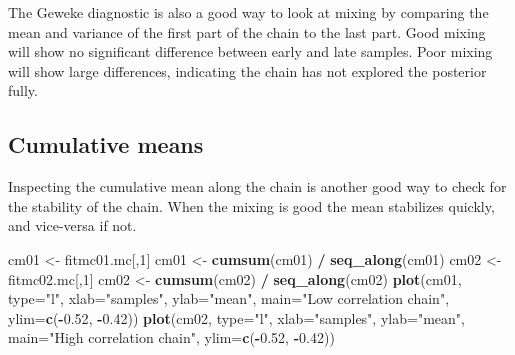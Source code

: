 \documentclass[
]{book}
\newenvironment{Shaded}{\begin{snugshade}}{\end{snugshade}}
\newcommand{\AttributeTok}[1]{\textcolor[rgb]{0.13,0.29,0.53}{#1}}
\newcommand{\DecValTok}[1]{\textcolor[rgb]{0.00,0.00,0.81}{#1}}
\newcommand{\FloatTok}[1]{\textcolor[rgb]{0.00,0.00,0.81}{#1}}
\newcommand{\FunctionTok}[1]{\textcolor[rgb]{0.13,0.29,0.53}{\textbf{#1}}}
\newcommand{\NormalTok}[1]{#1}
\newcommand{\OtherTok}[1]{\textcolor[rgb]{0.56,0.35,0.01}{#1}}
\newcommand{\SpecialCharTok}[1]{\textcolor[rgb]{0.81,0.36,0.00}{\textbf{#1}}}
\newcommand{\StringTok}[1]{\textcolor[rgb]{0.31,0.60,0.02}{#1}}
\begin{document}
The Geweke diagnostic is also a good way to look at mixing by comparing the mean and variance of the first part of the chain to the last part. Good mixing will show no significant difference between early and late samples. Poor mixing will show large differences, indicating the chain has not explored the posterior fully.

\hypertarget{cumulative-means}{%
\subsection{Cumulative means}\label{cumulative-means}}

Inspecting the cumulative mean along the chain is another good way to check for the stability of the chain. When the mixing is good the mean stabilizes quickly, and vice-versa if not.

\begin{Shaded}
\begin{Highlighting}[]
\NormalTok{cm01 }\OtherTok{\textless{}{-}}\NormalTok{ fitmc01.mc[,}\DecValTok{1}\NormalTok{]}
\NormalTok{cm01 }\OtherTok{\textless{}{-}} \FunctionTok{cumsum}\NormalTok{(cm01) }\SpecialCharTok{/} \FunctionTok{seq\_along}\NormalTok{(cm01)}
\NormalTok{cm02 }\OtherTok{\textless{}{-}}\NormalTok{ fitmc02.mc[,}\DecValTok{1}\NormalTok{]}
\NormalTok{cm02 }\OtherTok{\textless{}{-}} \FunctionTok{cumsum}\NormalTok{(cm02) }\SpecialCharTok{/} \FunctionTok{seq\_along}\NormalTok{(cm02)}
\FunctionTok{plot}\NormalTok{(cm01, }\AttributeTok{type=}\StringTok{"l"}\NormalTok{, }\AttributeTok{xlab=}\StringTok{"samples"}\NormalTok{, }\AttributeTok{ylab=}\StringTok{"mean"}\NormalTok{, }\AttributeTok{main=}\StringTok{"Low correlation chain"}\NormalTok{, }\AttributeTok{ylim=}\FunctionTok{c}\NormalTok{(}\SpecialCharTok{{-}}\FloatTok{0.52}\NormalTok{, }\SpecialCharTok{{-}}\FloatTok{0.42}\NormalTok{))}
\FunctionTok{plot}\NormalTok{(cm02, }\AttributeTok{type=}\StringTok{"l"}\NormalTok{, }\AttributeTok{xlab=}\StringTok{"samples"}\NormalTok{, }\AttributeTok{ylab=}\StringTok{"mean"}\NormalTok{, }\AttributeTok{main=}\StringTok{"High correlation chain"}\NormalTok{, }\AttributeTok{ylim=}\FunctionTok{c}\NormalTok{(}\SpecialCharTok{{-}}\FloatTok{0.52}\NormalTok{, }\SpecialCharTok{{-}}\FloatTok{0.42}\NormalTok{))}
\end{Highlighting}
\end{Shaded}
\end{document}
